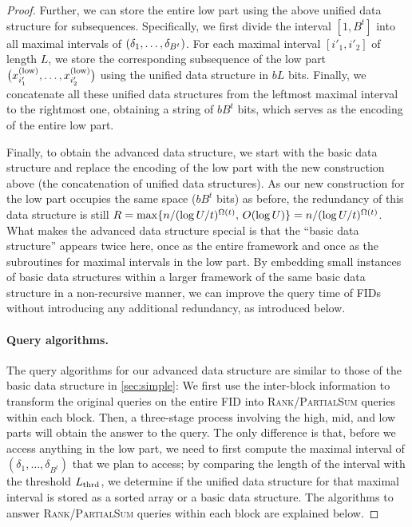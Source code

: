\documentclass{article}
\theoremstyle{plain}
\theoremstyle{definition}  \newtheorem{definition}[theorem]{Definition}
\DeclarePairedDelimiter{\bk}{(}{)}
\DeclarePairedDelimiter{\BK}{\{}{\}}
\newcommand{\xlow}[1][i]{x_{#1}^{(\textup{low})}}
\newcommand{\rank}{\textup{\textsc{Rank}}\xspace}
\newcommand{\partialsum}{\textup{\textsc{PartialSum}}\xspace}
\newcommand{\Lthrd}{L_{\textup{thrd}}}
\begin{document}
\begin{proof}
Further, we can store the entire low part using the above unified data structure for subsequences.
Specifically, we first divide the interval $[1, B^t]$ into all maximal intervals of $\bk{\delta_1, \ldots, \delta_{B^t}}$. For each maximal interval $[i'_1, i'_2]$ of length $L$, we store the corresponding subsequence of the low part $\bk[\big]{\xlow[i'_1], \ldots, \xlow[i'_2]}$ using the unified data structure in $bL$ bits. Finally, we concatenate all these unified data structures from the leftmost maximal interval to the rightmost one, obtaining a string of $b B^t$ bits, which serves as the encoding of the entire low part.

\smallskip

Finally, to obtain the advanced data structure, we start with the basic data structure and replace the encoding of the low part with the new construction above (the concatenation of unified data structures).
As our new construction for the low part occupies the same space ($bB^t$ bits) as before, the redundancy of this data structure is still $R = \max\BK{n/(\log U/t)^{\Omega(t)}, \, O(\log U)} = n/(\log U/t)^{\Omega(t)}$.
What makes the advanced data structure special is that the ``basic data structure'' appears twice here, once as the entire framework and once as the subroutines for maximal intervals in the low part. By embedding small instances of basic data structures within a larger framework of the same basic data structure in a non-recursive manner, we can improve the query time of FIDs without introducing any additional redundancy, as introduced below.

\paragraph*{Query algorithms.}

The query algorithms for our advanced data structure are similar to those of the basic data structure in \cref{sec:simple}: We first use the inter-block information to transform the original queries on the entire FID into \rank/\partialsum queries within each block. Then, a three-stage process involving the high, mid, and low parts will obtain the answer to the query. The only difference is that, before we access anything in the low part, we need to first compute the maximal interval of $(\delta_1, \ldots, \delta_{B^t})$ that we plan to access; by comparing the length of the interval with the threshold $\Lthrd$, we determine if the unified data structure for that maximal interval is stored as a sorted array or a basic data structure. The algorithms to answer \rank/\partialsum queries within each block are explained below.


\end{proof}
\end{document}
